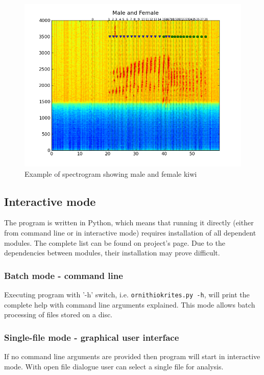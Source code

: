 \documentclass[paper=a4, fontsize=11pt]{scrartcl}	%
\numberwithin{equation}{section}		%
\numberwithin{figure}{section}			%
\numberwithin{table}{section}				%
\begin{document}
\begin{figure}[hbtp]
\label{fig:spectrogram}
\caption{Example of spectrogram showing male and female kiwi}
\centering
\includegraphics[scale=0.7]{spectrogram.png}
\end{figure}


\subsection{Interactive mode}
\label{sec:interactive_mode}
The program is written in Python, which means that running it directly (either from command line or in interactive mode) requires installation of all dependent modules. The complete list can be found on project's page. Due to the dependencies between modules, their installation may prove difficult.
\subsubsection{Batch mode - command line}
Executing program with '-h' switch, i.e. \texttt{ornithiokrites.py -h}, will print the complete help with command line arguments explained. This mode allows batch processing of files stored on a disc.
\subsubsection{Single-file mode - graphical user interface}
If no command line arguments are provided then program will start in interactive mode. With open file dialogue user can select a single file for analysis.
\end{document}
